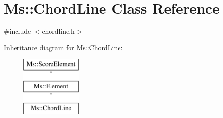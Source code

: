 \hypertarget{class_ms_1_1_chord_line}{}\section{Ms\+:\+:Chord\+Line Class Reference}
\label{class_ms_1_1_chord_line}


{\ttfamily \#include $<$chordline.\+h$>$}

Inheritance diagram for Ms\+:\+:Chord\+Line\+:\begin{figure}[H]
\begin{center}
\leavevmode
\includegraphics[height=3.000000cm]{class_ms_1_1_chord_line}
\end{center}
\end{figure}
